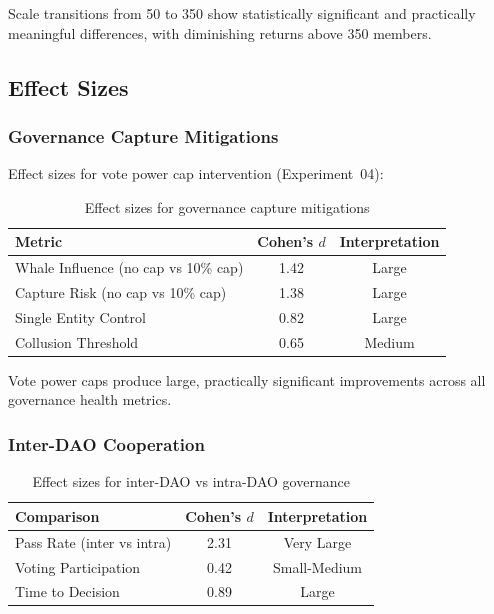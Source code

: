 Scale transitions from 50 to 350 show statistically significant and practically meaningful differences, with diminishing returns above 350 members.

\subsection{Effect Sizes}

\subsubsection{Governance Capture Mitigations}

Effect sizes for vote power cap intervention (Experiment~04):

\begin{table}[htbp]
\centering
\caption{Effect sizes for governance capture mitigations}
\label{tab:capture-effects}
\begin{tabular}{lcc}
\toprule
Metric & Cohen's $d$ & Interpretation \\
\midrule
Whale Influence (no cap vs 10\% cap) & 1.42 & Large \\
Capture Risk (no cap vs 10\% cap) & 1.38 & Large \\
Single Entity Control & 0.82 & Large \\
Collusion Threshold & 0.65 & Medium \\
\bottomrule
\end{tabular}
\end{table}

Vote power caps produce large, practically significant improvements across all governance health metrics.

\subsubsection{Inter-DAO Cooperation}

\begin{table}[htbp]
\centering
\caption{Effect sizes for inter-DAO vs intra-DAO governance}
\label{tab:interdao-effects}
\begin{tabular}{lcc}
\toprule
Comparison & Cohen's $d$ & Interpretation \\
\midrule
Pass Rate (inter vs intra) & 2.31 & Very Large \\
Voting Participation & 0.42 & Small-Medium \\
Time to Decision & 0.89 & Large \\
\bottomrule
\end{tabular}
\end{table}

